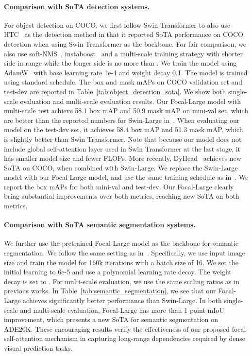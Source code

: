 \documentclass{article}
\begin{document}
\paragraph{Comparison with SoTA detection systems.}
For object detection on COCO, we first follow Swin Transformer to also use HTC~\cite{chen2019hybrid} as the detection method in that it reported SoTA performance on COCO detection when using Swin Transformer as the backbone. For fair comparison, we also use soft-NMS~\cite{bodla2017soft}, instaboost~\cite{fang2019instaboost} and a multi-scale training strategy with shorter side in range  while the longer side is no more than . We train the model using AdamW~\cite{loshchilov2017decoupled} with base learning rate 1e-4 and weight decay 0.1. The model is trained using standard  schedule. The box and mask mAPs on COCO validation set and test-dev are reported in Table~\ref{tab:object_detection_sota}. We show both single-scale evaluation and multi-scale evaluation results.
Our Focal-Large model with multi-scale test achieve 58.1 box mAP and 50.9 mask mAP on mini-val set, which are better than the reported numbers for Swin-Large in~\cite{liu2021swin}. When evaluating our model on the test-dev set, it achieves 58.4 box mAP and 51.3 mask mAP, which is slightly better than Swin Transformer. Note that because our model does not include global self-attention layer used in Swin Transformer at the last stage, it has smaller model size and fewer FLOPs. 
More recently, DyHead~\cite{dai2021dynamic} achieves new SoTA on COCO, when combined with Swin-Large. We replace the Swin-Large model with our Focal-Large model, and use the same   training schedule as in~\cite{dai2021dynamic}. We report the box mAPs for both mini-val and test-dev. Our Focal-Large clearly bring substantial improvements over both metrics, reaching new SoTA on both metrics.



\paragraph{Comparison with SoTA semantic segmentation systems.}
We further use the pretrained Focal-Large model as the backbone for semantic segmentation. We follow the same setting as in~\cite{liu2021swin}. Specifically, we use input image size  and train the model for 160k iterations with a batch size of 16. We set the initial learning to 6e-5 and use a polynomial learning rate decay. The weight decay is set to . For multi-scale evaluation, we use the same scaling ratios  as in previous works. In Table~\ref{tab:semantic_segmentation}, we see that our Focal-Large achieves significantly better performance than Swin-Large. In both single-scale and multi-scale evaluation, Focal-Large has more than 1 point mIoU improvement, which presents a new SoTA for semantic segmentation on ADE20K. These encouraging results verify the effectiveness of our proposed focal self-attention mechanism in capturing long-range dependencies required by dense visual prediction tasks.
\end{document}
